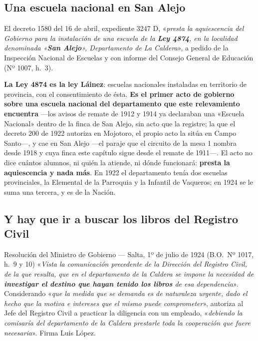 \subsection*{Una escuela nacional en San Alejo}

El decreto 1580 del 16 de abril, expediente 3247 D, «\textit{presta la aquiescencia del Gobierno
para la instalación de una escuela de la \textbf{Ley 4874}, en la localidad denominada
«\textbf{San Alejo}», Departamento de La Caldera}», a pedido de la Inspección Nacional de
Escuelas y con informe del Consejo General de Educación (Nº 1007, h.\ 3).

\begin{cautela}
\textbf{La Ley 4874 es la ley Láinez}: escuelas nacionales instaladas en territorio de provincia,
con el consentimiento de ésta. \textbf{Es el primer acto de gobierno sobre una escuela nacional del departamento que este
relevamiento encuentra} ---los avisos de remate de 1912 y 1914 ya declaraban una «Escuela Nacional» dentro de la finca de San Alejo, sin acto que la registre; la que el decreto 200 de 1922 autoriza en Mojotoro, el propio acto la
sitúa en Campo Santo---, y cae en San Alejo ---el paraje que el circuito de la mesa 1 nombra
desde 1918 y cuya finca este capítulo sigue desde el remate de 1911---. El acto no dice cuántos
alumnos, ni quién la atiende, ni dónde funcionará: \textbf{presta la aquiescencia y nada más}. En
1922 el departamento tenía dos escuelas provinciales, la Elemental de la Parroquia y la Infantil
de Vaqueros; en 1924 se le suma una tercera, y es de la Nación.
\end{cautela}

\subsection*{Y hay que ir a buscar los libros del Registro Civil}

\begin{ficha}{Resolución del Ministro de Gobierno --- Salta, 1º de julio de 1924 (B.O.\ Nº 1017, h.\ 9 y 10)}
«\textit{Vista la comunicación precedente de la Dirección del Registro Civil, de la que resulta,
que en el departamento de la Caldera se impone la necesidad de \textbf{investigar el destino que
hayan tenido los libros} de esa dependencia}». Considerando «\textit{que la medida que se demanda
es de naturaleza urgente, dado el hecho que la motiva e intereses que el mismo puede
comprometer}», autoriza al Jefe del Registro Civil a practicar la diligencia con un empleado,
«\textit{debiendo la comisaría del departamento de la Caldera prestarle toda la cooperación que
fuere necesaria}». Firma Luis López.
\end{ficha}

